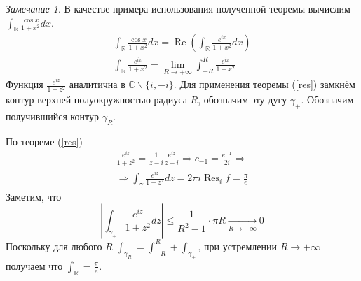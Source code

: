 \documentclass[12pt]{article}
\newcommand{\R}{\mathbb{R}}
\renewcommand{\C}{\mathbb{C}}
\newcommand{\Res}{\operatorname{Res}}
\renewcommand{\Re}{\operatorname{Re}}
\newcommand{\Ra}{\Rightarrow}
\theoremstyle{thmnote}
\theoremstyle{remark}
\newtheorem*{remark}{Замечание}
\theoremstyle{defnote}
\begin{document}
\begin{remark}
    В качестве примера использования полученной теоремы вычислим $\int_\R \frac{\cos x}{1 + x^2} dx$.
    \begin{gather*}
        \int_\R \frac{\cos x}{1 + x^2} dx = \Re \left( \int_\R \frac{e^{ix}}{1 + x^2} dx \right) \\
        \int_\R \frac{e^{ix}}{1 + x^2} = \lim_{R \to +\infty} \int_{-R}^{R} \frac{e^{ix}}{1 + x^2}
    \end{gather*}
    Функция $\frac{e^{iz}}{1 + z^2}$ аналитична в $\C \backslash \{i, -i\}$. Для применения теоремы (\ref{res}) замкнём контур верхней полуокружностью радиуса $R$, обозначим эту дугу $\gamma_+$. Обозначим получившийся контур $\gamma_R$.

    \begin{center}
    \end{center}

    По теореме (\ref{res})
    \begin{gather*}
        \frac{e^{iz}}{1 + z^2} = \frac{1}{z - i} \frac{e^{iz}}{z + i} \Ra c_{-1} = \frac{e^{-1}}{2i} \Ra \\
        \Ra \int_\gamma \frac{e^{iz}}{1 + z^2} dz = 2 \pi i \Res_i f = \frac{\pi}{e}
    \end{gather*}
    Заметим, что
    \begin{equation*}
        \left| \int_{\gamma_+} \frac{e^{iz}}{1 + z^2} dz \right| \leq \frac{1}{R^2 - 1} \cdot \pi R \underset{R \to +\infty}{\longrightarrow} 0
    \end{equation*}
    Поскольку для любого $R$ $\int_{\gamma_R} = \int_{-R}^{R} + \int_{\gamma_+}$, при устремлении $R \to +\infty$ получаем что $\int_\R = \frac{\pi}{e}$.
\end{remark}
\end{document}
